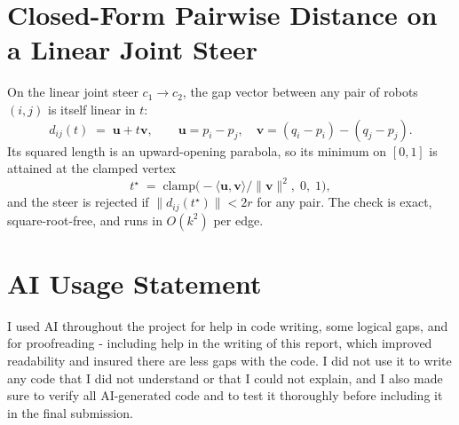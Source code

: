 \documentclass[12pt,a4paper]{article}
\begin{document}
    \section{Closed-Form Pairwise Distance on a Linear Joint Steer}
    \label{app:quadratic}
    On the linear joint steer $c_1\!\to\!c_2$, the gap vector between any pair of robots $(i,j)$ is itself linear in $t$:
    \[
        d_{ij}(t)\;=\;\mathbf{u}+t\mathbf{v},\qquad \mathbf{u}=p_i-p_j,\quad \mathbf{v}=(q_i-p_i)-(q_j-p_j).
    \]
    Its squared length is an upward-opening parabola, so its minimum on $[0,1]$ is attained at the clamped vertex
    \[
        t^\star\;=\;\mathrm{clamp}\!\bigl(-\langle\mathbf{u},\mathbf{v}\rangle/\|\mathbf{v}\|^2,\;0,\;1\bigr),
    \]
    and the steer is rejected if $\|d_{ij}(t^\star)\|<2r$ for any pair. The check is exact, square-root-free, and runs in $O(k^2)$ per edge.


    \section{AI Usage Statement}
    I used AI throughout the project for help in code writing, some logical gaps, and for proofreading - including help in the writing of this report, which improved readability and insured there are less gaps with the code.
    I did not use it to write any code that I did not understand or that I could not explain, and I also made sure to verify all AI-generated code and to test it thoroughly before including it in the final submission.
\end{document}
